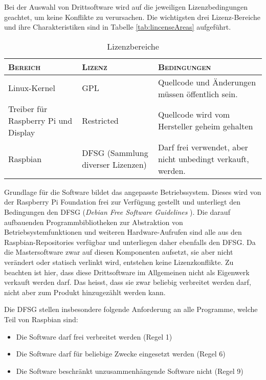 Bei    der   Auswahl    von    Drittsoftware   wird    auf   die    jeweiligen
Lizenzbedingungen   geachtet,   um   keine   Konflikte   zu   verursachen. Die
wichtigsten  drei Lizenz-Bereiche  und ihre  Charakteristiken sind  in Tabelle
\ref{tab:lincenseAreas} aufgef\"uhrt.

\begin{table}[h!tb]
    \centering
    \caption{Lizenzbereiche}
    \label{tab:licenseAreas}
    \small
    \begin{tabular}{>{\raggedright}p{30mm}>{\raggedright}p{30mm}p{50mm}}
        \toprule
        \textsc{Bereich} &
        \textsc{Lizenz} &
        \textsc{Bedingungen} \\
        \midrule
        Linux-Kernel &
        GPL &
        Quellcode und \"Anderungen m\"ussen \"offentlich sein. \\
        [2mm]

        \rowcolor{solarized-base2}
        Treiber f\"ur Raspberry Pi und Display &
        Restricted &
        Quellcode wird vom Hersteller geheim gehalten \\
        [2mm]

        Raspbian &
        DFSG (Sammlung diverser Lizenzen) &
        Darf frei verwendet, aber nicht unbedingt verkauft, werden. \\
        \bottomrule
    \end{tabular}
\end{table}

Grundlage  f\"ur die  Software  bildet  das angepasste  Betriebssystem. Dieses
wird  von  der Raspberry  Pi  Foundation  frei  zur Verf\"ugung  gestellt  und
unterliegt den  Bedingungen den  DFSG (\emph{Debian Free  Software Guidelines}
\cite{ref:socialContract}). Die  darauf  aufbauenden Programmbibliotheken  zur
Abstraktion  von Betriebsystemfunktionen  und weiteren  Hardware-Aufrufen sind
alle aus den Raspbian-Repositories verf\"ugbar und unterliegen daher ebenfalls
den  DFSG.   Da  die  Mastersoftware zwar  auf  diesen  Komponenten  aufsetzt,
sie  aber  nicht ver\"andert  oder  statisch  verlinkt wird,  entstehen  keine
Lizenzkonflikte. Zu beachten ist hier, dass diese Drittsoftware im Allgemeinen
nicht als Eigenwerk  verkauft werden darf. Das heisst, dass  sie zwar beliebig
verbreitet werden darf, nicht aber zum Produkt hinzugez\"ahlt werden kann.

Die DFSG stellen  insbesondere folgende Anforderung an  alle Programme, welche
Teil von Raspbian sind:

\begin{itemize}
    \tightlist
\item
    Die Software darf frei verbreitet werden (Regel 1)
\item
    Die Software darf f\"ur beliebige Zwecke eingesetzt werden (Regel 6)
\item
    Die Software beschr\"ankt unzusammenh\"angende Software nicht (Regel 9)
\end{itemize}

